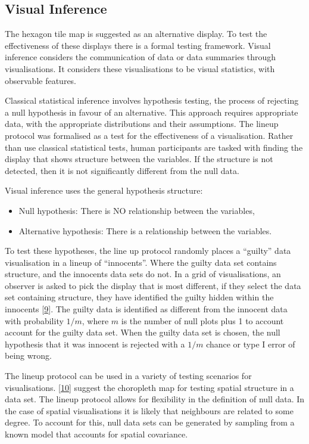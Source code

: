 \documentclass[conference,final,]{IEEEtran}
\begin{document}
\hypertarget{visual-inference}{%
\subsection{Visual Inference}\label{visual-inference}}

The hexagon tile map is suggested as an alternative display. To test the effectiveness of these displays there is a formal testing framework. Visual inference considers the communication of data or data summaries through visualisations. It considers these visualisations to be visual statistics, with observable features.

Classical statistical inference involves hypothesis testing, the process of rejecting a null hypothesis in favour of an alternative. This approach requires appropriate data, with the appropriate distributions and their assumptions.
The lineup protocol was formalised as a test for the effectiveness of a visualisation. Rather than use classical statistical tests, human participants are tasked with finding the display that shows structure between the variables. If the structure is not detected, then it is not significantly different from the null data.

Visual inference uses the general hypothesis structure:

\begin{itemize}
\item
  Null hypothesis: There is NO relationship between the variables,
\item
  Alternative hypothesis: There is a relationship between the variables.
\end{itemize}

To test these hypotheses, the line up protocol randomly places a ``guilty'' data visualisation in a lineup of ``innocents''. Where the guilty data set contains structure, and the innocents data sets do not.
In a grid of visualisations, an observer is asked to pick the display that is most different, if they select the data set containing structure, they have identified the guilty hidden within the innocents {[}\protect\hyperlink{ref-GTPCCD}{9}{]}.
The guilty data is identified as different from the innocent data with probability \(1/m\), where \(m\) is the number of null plots plus 1 to account account for the guilty data set. When the guilty data set is chosen, the null hypothesis that it was innocent is rejected with a \(1/m\) chance or type I error of being wrong.

The lineup protocol can be used in a variety of testing scenarios for visualisations. {[}\protect\hyperlink{ref-GIIV}{10}{]} suggest the choropleth map for testing spatial structure in a data set. The lineup protocol allows for flexibility in the definition of null data. In the case of spatial visualisations it is likely that neighbours are related to some degree. To account for this, null data sets can be generated by sampling from a known model that accounts for spatial covariance.
\end{document}
